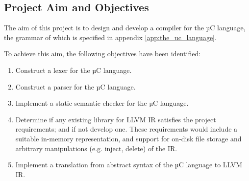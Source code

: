 
\subsection{Project Aim and Objectives}
\label{sec:intro_project_aim_and_objectives}

The aim of this project is to design and develop a compiler for the µC language, the grammar of which is specified in appendix \ref{app:the_uc_language}.

To achieve this aim, the following objectives have been identified:

\begin{enumerate}
	\item \label{itm:obj_lexical_analysis} Construct a lexer for the µC language.
	\item \label{itm:obj_syntactic_analysis} Construct a parser for the µC language.
	\item \label{itm:obj_semantic_analysis} Implement a static semantic checker for the µC language.
	\item \label{itm:obj_intermediate_representation} Determine if any existing library for LLVM IR satisfies the project requirements; and if not develop one. These requirements would include a suitable in-memory representation, and support for on-disk file storage and arbitrary manipulations (e.g. inject, delete) of the IR.
	\item \label{itm:obj_ir_generation} Implement a translation from abstract syntax of the µC language to LLVM IR.
\end{enumerate}
